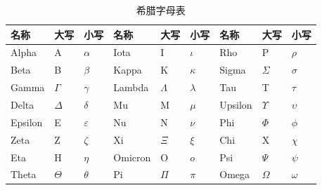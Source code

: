 \documentclass[12pt,a4paper,openany]{ctexbook}
\begin{document}
\begin{table}[htbp]
  \centering
  \caption{希腊字母表}
  \label{tabA.4}
  \begin{tabular}{l l l l l l l l l}
    \toprule
    名称 & 大写 & 小写 & 名称 & 大写 & 小写 & 名称 & 大写 & 小写 \\
    \midrule
    Alpha & A & $\alpha$ & Iota & I & $\iota$ & Rho & P & $\rho$ \\
    Beta & B & $\beta$ & Kappa & K & $\kappa$ & Sigma & $\Sigma$ & $\sigma$ \\
    Gamma & $\Gamma$ & $\gamma$ & Lambda & $\Lambda$ & $\lambda$ & Tau & T & $\tau$ \\
    Delta & $\Delta$ & $\delta$ & Mu & M & $\mu$ & Upsilon & $\Upsilon$ & $\upsilon$ \\
    Epsilon & E & $\varepsilon$ & Nu & N & $\nu$ & Phi & $\Phi$ & $\phi$ \\
    Zeta & Z & $\zeta$ & Xi & $\Xi$ & $\xi$ & Chi & X & $\chi$ \\
    Eta & H & $\eta$ & Omicron & O & $o$ & Psi & $\Psi$ & $\psi$ \\
    Theta & $\Theta$ & $\theta$ & Pi & $\Pi$ & $\pi$ & Omega & $\Omega$ & $\omega$ \\
    \bottomrule
  \end{tabular}
\end{table}
\end{document}
